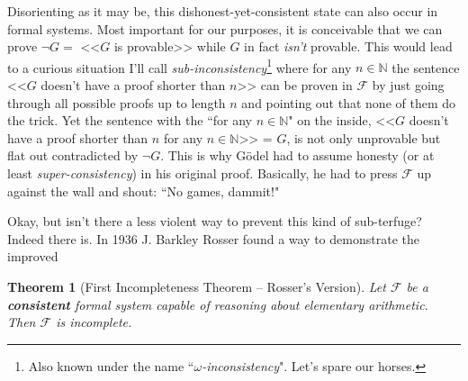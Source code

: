 \documentclass{article}
\theoremstyle{theorem}
\newtheorem{theorem}{Theorem}
\begin{document}
Disorienting as it may be, this dishonest-yet-consistent state can also occur in formal systems. Most important for our purposes, it is conceivable that we can prove $\neg G =$ <<$G$ is provable>> while $G$ in fact \textit{isn't} provable. This would lead to a curious situation I'll call \textit{sub-inconsistency}\footnote{Also known under the name ``\textit{$\omega$-inconsistency}". Let's spare our horses.} where for any $n\in\mathbb{N}$ the sentence <<$G$ doesn't have a proof shorter than $n$>> can be proven in $\mathcal{F}$ by just going through all possible proofs up to length $n$ and pointing out that none of them do the trick. Yet the sentence with the ``for any $n\in\mathbb{N}$" on the inside, <<$G$ doesn't have a proof shorter than $n$ for any $n\in\mathbb{N}$>> = $G$, is not only unprovable but flat out contradicted by $\neg G$. This is why Gödel had to assume honesty (or at least \textit{super-consistency}) in his original proof. Basically, he had to press $\mathcal{F}$ up against the wall and shout: ``No games, dammit!"

Okay, but isn't there a less violent way to prevent this kind of sub-terfuge? Indeed there is. In 1936 J. Barkley Rosser found a way to demonstrate the improved

\begin{theorem}[First Incompleteness Theorem -- Rosser's Version]
Let $\mathcal{F}$ be a \textbf{consistent} formal system capable of reasoning about elementary arithmetic. Then $\mathcal{F}$ is incomplete.
\end{theorem}
\end{document}
